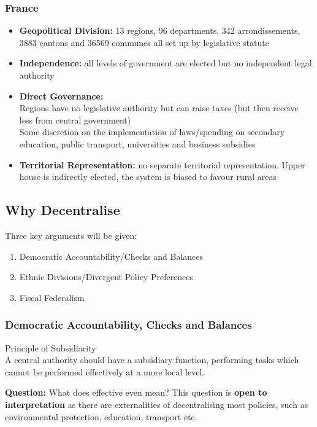 \documentclass[12pt, letterpaper]{article}
\begin{document}
\subsubsection{France}
\begin{itemize}
	\item \textbf{Geopolitical Division:} 13 regions, 96 departments, 342 arrondissements, 3883 cantons and 36569 communes all set up by legislative statute
	\item \textbf{Independence:} all levels of government are elected but no independent legal authority
	\item \textbf{Direct Governance:}\\ 
		Regions have no legislative authority but can raise taxes (but then receive less from central government)\\
		Some discretion on the implementation of laws/spending on secondary education, public transport, universities and business subsidies
	\item \textbf{Territorial Representation:} no separate territorial representation. Upper house is indirectly elected, the system is biased to favour rural areas
\end{itemize}

\subsection{Why Decentralise}
Three key arguments will be given:
\begin{enumerate}
	\item Democratic Accountability/Checks and Balances
	\item Ethnic Divisions/Divergent Policy Preferences
	\item Fiscal Federalism
\end{enumerate}

\subsubsection{Democratic Accountability, Checks and Balances}
Principle of Subsidiarity\\ 
A central authority should have a subsidiary function, performing tasks which cannot be performed effectively at a more local level.

\textbf{Question:} What does effective even mean? This question is \textbf{open to interpretation} as there are externalities of decentralising most policies, such as environmental protection, education, transport etc.
\end{document}
